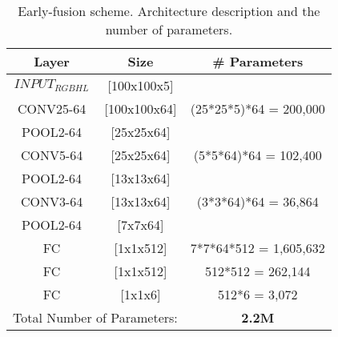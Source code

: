 \documentclass[review,12pt,3p]{elsarticle}
\begin{document}
\begin{table}[!ht]
\centering
\scriptsize
\begin{tabular}{  c  c | c}

         Layer&  Size     & \# Parameters \\
               \hline
$INPUT_{RGBHL}$&     [100x100x5]  		&     \\
CONV25-64& [100x100x64] 		&   (25*25*5)*64 	  =      200,000\\
POOL2-64&  [25x25x64] &	\\
CONV5-64&  [25x25x64] 			&   (5*5*64)*64 	  =      102,400\\
POOL2-64&  [13x13x64] &	\\
CONV3-64&  [13x13x64] 			&   (3*3*64)*64 	  =       36,864\\
POOL2-64&  [7x7x64] 			&   \\
FC&         [1x1x512] 			&   7*7*64*512   	  =    1,605,632\\
FC&         [1x1x512] 			&   512*512 	          =      262,144\\
FC&         [1x1x6]		    	&   512*6 	  	  =        3,072\\
\hline
\multicolumn{2}{c}{ Total Number of Parameters:} & \textbf{2.2M} \\

\end{tabular}
\caption{Early-fusion scheme. Architecture description and the number of parameters.}
\label{tab:earlyStyle}
\end{table}
\end{document}
